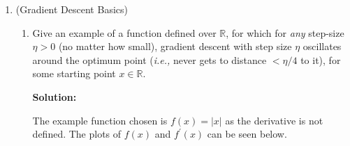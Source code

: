 \documentclass[12pt]{article}
\newcommand{\abs}[1]{\left| #1 \right|}
\newcommand{\R}{\mathbb{R}}
\begin{document}
\begin{enumerate}
\begin{enumerate}
\begin{align*}
  f(x) &=  f\left( \frac{y + z}{2}\right) = f(\lambda z + (1-\lambda)y)
  \intertext{Where the above is obtained with $\lambda = 1/2$. By definition of convexity, we can bound it as}
  f(x) &= f\left( \frac{y + z}{2}\right) < \frac{1}{2}f(z) + \frac{1}{2}f(y)\\
  \intertext{Given that $f(x)$ is a maximizer for $f$, then it is trivially true that $f(y), f(z) < f(x)$. We can substitute this into the above equation, resulting in}
  f(x) &< \frac{1}{2}f(z) + \frac{1}{2}f(y) < \frac{1}{2}f(x) + \frac{1}{2}f(x)
\end{align*}

The last line results in the inequality that $f(x) < f(x)$, which is a contraction. Therefore we can say $x \in \delta (K)$.



\end{enumerate}

\newpage

\item (Gradient Descent Basics)

\begin{enumerate}
  \item Give an example of a function defined over $\R$, for which for {\em any} step-size $\eta > 0$ (no matter how small), gradient descent with step size $\eta$ oscillates around the optimum point ({\em i.e.,} never gets to distance $< \eta / 4$ to it), for some starting point $x \in \R$. 

      {\bf Solution:}

The example function chosen is $f(x) = \abs{x}$ as the derivative is not defined. The plots of $f(x)$ and $f^{\prime}(x)$ can be seen below.

\hspace{-2.5em}
\hspace{-2.5em}
{ %
\pgfplotsset{ymin=-1.25, ymax=1.25}
}


\end{enumerate}
\end{enumerate}
\end{document}
